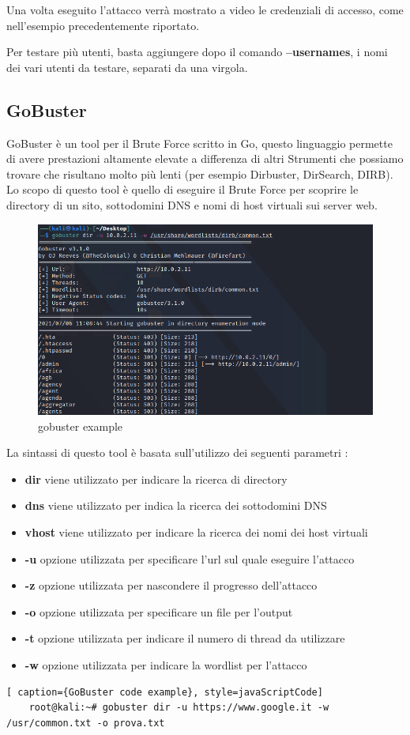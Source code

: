 Una volta eseguito l'attacco verrà mostrato a video le credenziali di accesso, come nell'esempio precedentemente riportato.

Per testare più utenti, basta aggiungere dopo il comando \textbf{--usernames}, i nomi dei vari utenti da testare, separati da una virgola.

\newpage


\subsection{GoBuster}

GoBuster\cite{gobuster} è un tool per il Brute Force scritto in Go, questo linguaggio permette di avere prestazioni altamente elevate a differenza di altri Strumenti che possiamo trovare che risultano molto più lenti (per esempio Dirbuster, DirSearch, DIRB). Lo scopo di questo tool è quello di eseguire il Brute Force per scoprire le directory di un sito, sottodomini DNS e nomi di host virtuali sui server web.

\begin{figure}[htpb!]
    \centering
    \includegraphics[width=\linewidth]{Immagini/5/gobuster.png}
    \caption{gobuster example}
    \label{fig:gobuster example}
\end{figure}

La sintassi di questo tool è basata sull'utilizzo dei seguenti parametri :
\begin{itemize}
    \item \textbf{dir} viene utilizzato per indicare la ricerca di directory
    \item \textbf{dns} viene utilizzato per indica la ricerca dei sottodomini DNS
    \item \textbf{vhost} viene utilizzato per indicare la ricerca dei nomi dei host virtuali
    \item \textbf{-u} opzione  utilizzata per specificare l'url sul quale eseguire l'attacco
    \item \textbf{-z} opzione utilizzata per nascondere il progresso dell'attacco
    \item \textbf{-o} opzione utilizzata per specificare un file per l'output 
    \item \textbf{-t} opzione utilizzata per indicare il numero di thread da utilizzare 
    \item \textbf{-w} opzione utilizzata per indicare la wordlist per l'attacco
\end{itemize}

\begin{lstlisting}[ caption={GoBuster code example}, style=javaScriptCode]
    root@kali:~# gobuster dir -u https://www.google.it -w /usr/common.txt -o prova.txt
\end{lstlisting}

\label{chap:conc}

